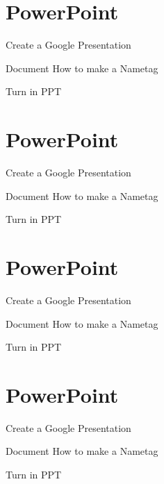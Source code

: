\documentclass{article}
\def\ppt{PowerPoint}
\begin{document}
	\section{\ppt}
	\begin{todolist}
		\item Create a Google Presentation
		\item Document How to make a Nametag
		\item Turn in PPT
	\end{todolist}\section{\ppt}
\begin{todolist}
\item Create a Google Presentation
\item Document How to make a Nametag
\item Turn in PPT
\end{todolist}\section{\ppt}
\begin{todolist}
\item Create a Google Presentation
\item Document How to make a Nametag
\item Turn in PPT
\end{todolist}\section{\ppt}
\begin{todolist}
\item Create a Google Presentation
\item Document How to make a Nametag
\item Turn in PPT
\end{todolist}

\newpage
\end{document}
